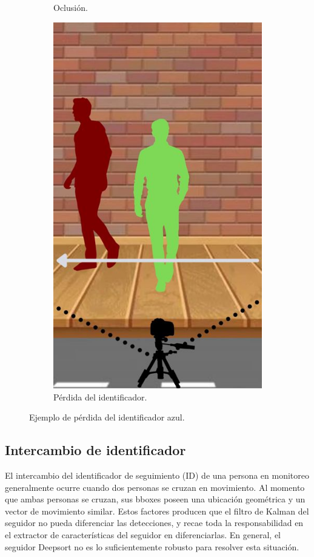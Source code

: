 \begin{figure}[!htpb]
\begin{subfigure}[b]{0.3\textwidth}
         \caption{Oclusión.}
         \label{fig:id_lost2de3}
     \end{subfigure}
     \hfill
     \begin{subfigure}[b]{0.3\textwidth}
         \centering
         \includegraphics[width=.65\textwidth]{./Figures/id_lost3.jpg}
         \caption{Pérdida del identificador.}
         \label{fig:id_lost3de3}
     \end{subfigure}
        \caption{Ejemplo de pérdida del identificador azul.}
        \label{fig:id_lost}
\end{figure}

\newpage

\subsection{Intercambio de identificador}

El intercambio del identificador de seguimiento (ID) de una persona en monitoreo generalmente ocurre cuando dos personas se cruzan en movimiento. Al momento que ambas personas se cruzan, sus bboxes poseen una ubicación geométrica y un vector de movimiento similar. Estos factores producen que el filtro de Kalman del seguidor no pueda diferenciar las detecciones, y recae toda la responsabilidad en el extractor de características del seguidor en diferenciarlas. En general, el seguidor Deepsort no es lo suficientemente robusto para resolver esta situación.

